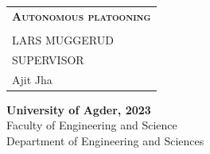 \begin{titlepage}

\newcommand{\projectTitle}{Autonomous platooning}
\newcommand{\projectSubTitlel}{}
\newcommand{\authors}{LARS MUGGERUD}
\newcommand{\supervisor}{Ajit Jha}

\newcommand{\projectYear}{2023}
\newcommand{\facultyName}{Faculty of Engineering and Science}
\newcommand{\departmentName}{Department of Engineering and Sciences}




\begin{tabular}{p{12cm}}
                                            \\[5cm]
    \LARGE{\textsc{\textbf{\projectTitle}}} \\[1.5cm]
    \projectSubTitlel                       \\[2.5cm]
    \large{\authors}                        \\[9cm]
    \Large{SUPERVISOR}                      \\
    \supervisor
\end{tabular}



\vfill


\textbf{University of Agder, \projectYear} \\
\small{\facultyName \\
\departmentName}
\vspace{1cm}
\end{titlepage}
